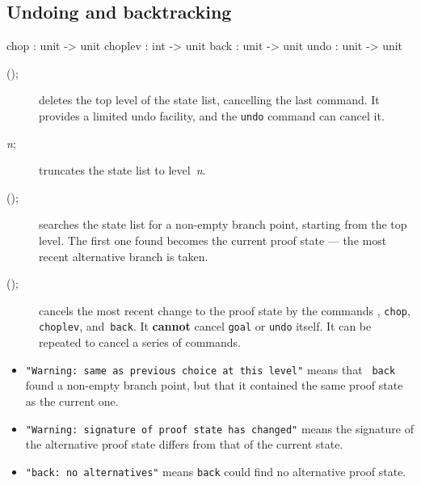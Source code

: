 \subsection{Undoing and backtracking}
\begin{ttbox} 
chop    : unit -> unit
choplev : int -> unit
back    : unit -> unit
undo    : unit -> unit
\end{ttbox}
\begin{description}
\item[();] 
deletes the top level of the state list, cancelling the last 
command.  It provides a limited undo facility, and the {\tt undo} command
can cancel it.

\item[ {\it n};] 
truncates the state list to level~{\it n}. 

\item[();]
searches the state list for a non-empty branch point, starting from the top
level.  The first one found becomes the current proof state --- the most
recent alternative branch is taken.

\item[();] 
cancels the most recent change to the proof state by the commands ,
{\tt chop}, {\tt choplev}, and~{\tt back}.  It {\bf cannot}
cancel {\tt goal} or {\tt undo} itself.  It can be repeated to
cancel a series of commands.
\end{description}
\begin{itemize}
\item
{\tt"Warning:\ same as previous choice at this level"} means that {\tt
back} found a non-empty branch point, but that it contained the same proof
state as the current one.  
\item
{\tt "Warning:\ signature of proof state has changed"} means the signature
of the alternative proof state differs from that of the current state.
\item 
{\tt "back:\ no alternatives"} means {\tt back} could find no alternative
proof state.
\end{itemize}

